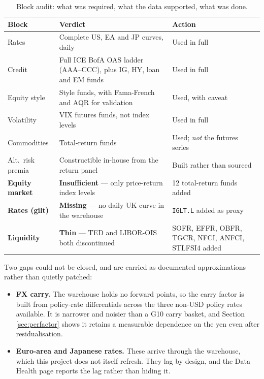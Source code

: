 \documentclass[11pt,a4paper]{article}
\newcommand{\code}[1]{\texttt{\small #1}}
\begin{document}
\begin{table}[htbp]
\centering
\caption{Block audit: what was required, what the data supported, what was done.}
\label{tab:audit}
\small
\begin{tabularx}{\textwidth}{@{}lXl@{}}
\toprule
\textbf{Block} & \textbf{Verdict} & \textbf{Action} \\
\midrule
Rates & Complete US, EA and JP curves, daily & Used in full \\
Credit & Full ICE BofA OAS ladder (AAA--CCC), plus IG, HY, loan and EM funds & Used in full \\
Equity style & Style funds, with Fama-French and AQR for validation & Used, with caveat \\
Volatility & VIX futures funds, not index levels & Used in full \\
Commodities & Total-return funds & Used; \emph{not} the futures series \\
Alt.\ risk premia & Constructible in-house from the return panel & Built rather than sourced \\
\addlinespace
\textbf{Equity market} & \textbf{Insufficient} --- only price-return index levels & 12 total-return funds added \\
\textbf{Rates (gilt)} & \textbf{Missing} --- no daily UK curve in the warehouse & \code{IGLT.L} added as proxy \\
\textbf{Liquidity} & \textbf{Thin} --- TED and LIBOR-OIS both discontinued & SOFR, EFFR, OBFR, TGCR, NFCI, ANFCI, STLFSI4 added \\
\bottomrule
\end{tabularx}
\end{table}

Two gaps could not be closed, and are carried as documented approximations rather
than quietly patched:

\begin{itemize}[leftmargin=1.4em,itemsep=0.3ex]
\item \textbf{FX carry.} The warehouse holds no forward points, so the carry factor is
  built from policy-rate differentials across the three non-USD policy rates
  available. It is narrower and noisier than a G10 carry basket, and Section
  \ref{sec:perfactor} shows it retains a measurable dependence on the yen even after
  residualisation.
\item \textbf{Euro-area and Japanese rates.} These arrive through the warehouse,
  which this project does not itself refresh. They lag by design, and the Data Health
  page reports the lag rather than hiding it.
\end{itemize}
\end{document}
